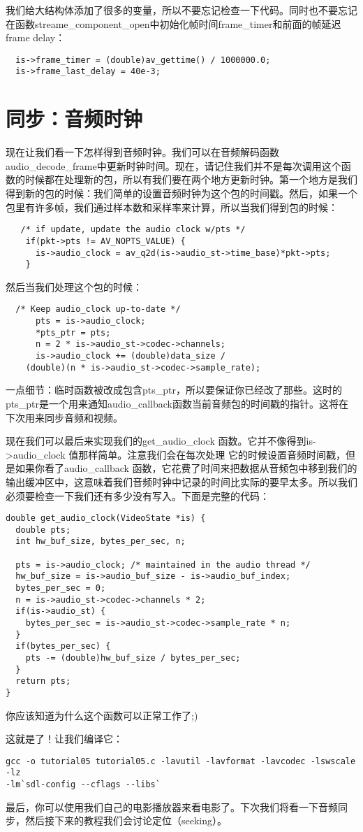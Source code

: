 我们给大结构体添加了很多的变量，所以不要忘记检查一下代码。同时也不要忘记在函数streame_component_open中初始化帧时间frame_timer和前面的帧延迟frame delay：

\begin{lstlisting}
  is->frame_timer = (double)av_gettime() / 1000000.0;
  is->frame_last_delay = 40e-3;
\end{lstlisting}

\section{同步：音频时钟}

现在让我们看一下怎样得到音频时钟。我们可以在音频解码函数audio_decode_frame中更新时钟时间。现在，请记住我们并不是每次调用这个函数的时候都在处理新的包，所以有我们要在两个地方更新时钟。第一个地方是我们得到新的包的时候：我们简单的设置音频时钟为这个包的时间戳。然后，如果一个包里有许多帧，我们通过样本数和采样率来计算，所以当我们得到包的时候：

\begin{lstlisting}
   /* if update, update the audio clock w/pts */
    if(pkt->pts != AV_NOPTS_VALUE) {
      is->audio_clock = av_q2d(is->audio_st->time_base)*pkt->pts;
    }
\end{lstlisting}
然后当我们处理这个包的时候：
\begin{lstlisting}
  /* Keep audio_clock up-to-date */
      pts = is->audio_clock;
      *pts_ptr = pts;
      n = 2 * is->audio_st->codec->channels;
      is->audio_clock += (double)data_size /
    (double)(n * is->audio_st->codec->sample_rate);
\end{lstlisting}

一点细节：临时函数被改成包含pts_ptr，所以要保证你已经改了那些。这时的pts_ptr是一个用来通知audio_callback函数当前音频包的时间戳的指针。这将在下次用来同步音频和视频。

现在我们可以最后来实现我们的get_audio_clock 函数。它并不像得到is->audio_clock 值那样简单。注意我们会在每次处理 它的时候设置音频时间戳，但是如果你看了audio_callback 函数，它花费了时间来把数据从音频包中移到我们的输出缓冲区中，这意味着我们音频时钟中记录的时间比实际的要早太多。所以我们必须要检查一下我们还有多少没有写入。下面是完整的代码：

\begin{lstlisting}
double get_audio_clock(VideoState *is) {
  double pts;
  int hw_buf_size, bytes_per_sec, n;

  pts = is->audio_clock; /* maintained in the audio thread */
  hw_buf_size = is->audio_buf_size - is->audio_buf_index;
  bytes_per_sec = 0;
  n = is->audio_st->codec->channels * 2;
  if(is->audio_st) {
    bytes_per_sec = is->audio_st->codec->sample_rate * n;
  }
  if(bytes_per_sec) {
    pts -= (double)hw_buf_size / bytes_per_sec;
  }
  return pts;
}
\end{lstlisting}

你应该知道为什么这个函数可以正常工作了;)

这就是了！让我们编译它：

\begin{lstlisting}
gcc -o tutorial05 tutorial05.c -lavutil -lavformat -lavcodec -lswscale -lz
-lm`sdl-config --cflags --libs`
\end{lstlisting}

最后，你可以使用我们自己的电影播放器来看电影了。下次我们将看一下音频同步，然后接下来的教程我们会讨论定位（seeking）。
